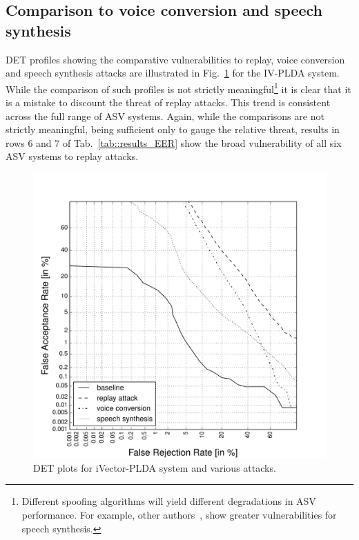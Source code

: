 \subsection{Comparison to voice conversion and speech synthesis}


DET profiles showing the comparative vulnerabilities to replay, voice conversion and speech synthesis attacks are illustrated in Fig.~\ref{fig::DETs_4attacks} for the IV-PLDA system.  While the comparison of such profiles is not strictly meaningful\footnote{Different spoofing algorithms will yield different degradations in ASV performance.  For example, other authors~\cite{Wu2015,Ergunay2015,DeLeon2012}, show greater vulnerabilities for speech synthesis.} it is clear that it is a mistake to discount the threat of replay attacks.  This trend is consistent across the full range of ASV systems.  Again, while the comparisons are not strictly meaningful, being sufficient only to gauge the relative threat, results in rows 6 and 7 of Tab.~\ref{tab::results_EER} show the broad vulnerability of all six ASV systems to replay attacks.

\begin{figure}[!t]
	\centering
	\includegraphics[width=1\linewidth]{Figs/DETs_IV_ss_vc_rp.pdf}
	\caption{DET plots for iVector-PLDA system and various attacks.}
	\label{fig::DETs_4attacks}
\end{figure}





